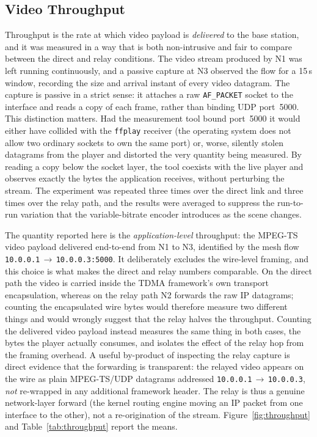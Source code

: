 \subsection{Video Throughput}
\label{subsec:res-throughput}

Throughput is the rate at which video payload is \emph{delivered} to the base
station, and it was measured in a way that is both non-intrusive and fair to
compare between the direct and relay conditions. The video stream produced by
N1 was left running continuously, and a passive capture at N3 observed the
flow for a 15\,s window, recording the size and arrival instant of every video
datagram. The capture is passive in a strict sense: it attaches a raw
\texttt{AF\_PACKET} socket to the interface and reads a copy of each frame,
rather than binding UDP port~5000. This distinction matters. Had the
measurement tool bound port~5000 it would either have collided with the
\texttt{ffplay} receiver (the operating system does not allow two ordinary
sockets to own the same port) or, worse, silently stolen datagrams from the
player and distorted the very quantity being measured. By reading a copy below
the socket layer, the tool coexists with the live player and observes exactly
the bytes the application receives, without perturbing the stream. The
experiment was repeated three times over the direct link and three times over
the relay path, and the results were averaged to suppress the run-to-run
variation that the variable-bitrate encoder introduces as the scene changes.

The quantity reported here is the \emph{application-level} throughput: the
MPEG-TS video payload delivered end-to-end from N1 to N3, identified by the
mesh flow \texttt{10.0.0.1}\,$\to$\,\texttt{10.0.0.3:5000}. It deliberately
excludes the wire-level framing, and this choice is what makes the direct and
relay numbers comparable. On the direct path the video is carried inside the
TDMA framework's own transport encapsulation, whereas on the relay path N2
forwards the raw IP datagrams; counting the encapsulated wire bytes would
therefore measure two different things and would wrongly suggest that the relay
halves the throughput. Counting the delivered video payload instead measures
the same thing in both cases, the bytes the player actually consumes, and
isolates the effect of the relay hop from the framing overhead. A useful
by-product of inspecting the relay capture is direct evidence that the
forwarding is transparent: the relayed video appears on the wire as plain
MPEG-TS/UDP datagrams addressed \texttt{10.0.0.1}\,$\to$\,\texttt{10.0.0.3},
\emph{not} re-wrapped in any additional framework header. The relay is thus a
genuine network-layer forward (the kernel routing engine moving an IP packet
from one interface to the other), not a re-origination of the stream.
Figure~\ref{fig:throughput} and Table~\ref{tab:throughput} report the means.

